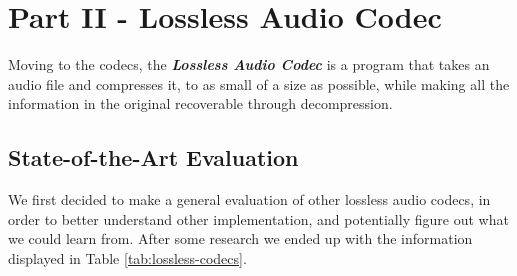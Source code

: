 \chapter{Part II - Lossless Audio Codec}

Moving to the codecs, the \textbf{\textit{Lossless Audio Codec}} is a program that takes an audio file and compresses it, to as small of a size as possible, while making all the information in the original recoverable through decompression.

\vspace{10pt}
\section{State-of-the-Art Evaluation}

We first decided to make a general evaluation of other lossless audio codecs, in order to better understand other implementation, and potentially figure out what we could learn from. After some research we ended up with the information displayed in Table \ref{tab:lossless-codecs}.



